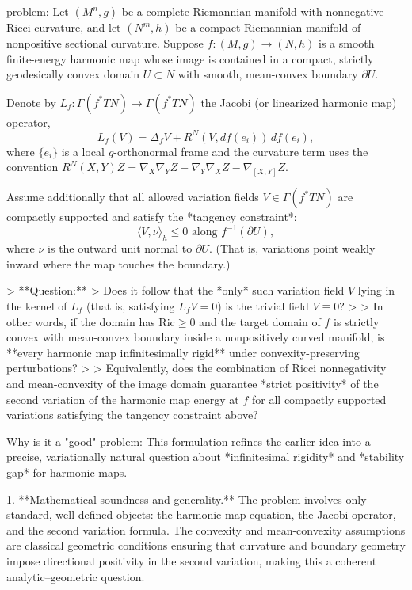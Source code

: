 problem:  
Let \((M^n,g)\) be a complete Riemannian manifold with nonnegative Ricci curvature, and let \((N^m,h)\) be a compact Riemannian manifold of nonpositive sectional curvature.  
Suppose \(f:(M,g)\to (N,h)\) is a smooth finite-energy harmonic map whose image is contained in a compact, strictly geodesically convex domain \(U\subset N\) with smooth, mean-convex boundary \( \partial U\).  

Denote by \(L_f:\Gamma(f^*TN)\to\Gamma(f^*TN)\) the Jacobi (or linearized harmonic map) operator,  
\[
L_f(V) = \Delta_f V + R^N(V,df(e_i))\,df(e_i),
\]
where \(\{e_i\}\) is a local \(g\)-orthonormal frame and the curvature term uses the convention \(R^N(X,Y)Z = \nabla_X\nabla_Y Z - \nabla_Y\nabla_X Z - \nabla_{[X,Y]}Z.\)

Assume additionally that all allowed variation fields \(V\in \Gamma(f^*TN)\) are compactly supported and satisfy the *tangency constraint*:
\[
\langle V, \nu\rangle_h \le 0 \text{ along } f^{-1}(\partial U),
\]
where \(\nu\) is the outward unit normal to \(\partial U.\)  (That is, variations point weakly inward where the map touches the boundary.)

> **Question:**  
> Does it follow that the *only* such variation field \(V\) lying in the kernel of \(L_f\) (that is, satisfying \(L_f V = 0\)) is the trivial field \(V\equiv 0\)?  
>  
> In other words, if the domain has \(\mathrm{Ric}\ge 0\) and the target domain of \(f\) is strictly convex with mean-convex boundary inside a nonpositively curved manifold, is **every harmonic map infinitesimally rigid** under convexity-preserving perturbations?  
>  
> Equivalently, does the combination of Ricci nonnegativity and mean-convexity of the image domain guarantee *strict positivity* of the second variation of the harmonic map energy at \(f\) for all compactly supported variations satisfying the tangency constraint above?

Why is it a "good" problem:  
This formulation refines the earlier idea into a precise, variationally natural question about *infinitesimal rigidity* and *stability gap* for harmonic maps.  

1. **Mathematical soundness and generality.**  
   The problem involves only standard, well‑defined objects: the harmonic map equation, the Jacobi operator, and the second variation formula.  The convexity and mean-convexity assumptions are classical geometric conditions ensuring that curvature and boundary geometry impose directional positivity in the second variation, making this a coherent analytic–geometric question.

